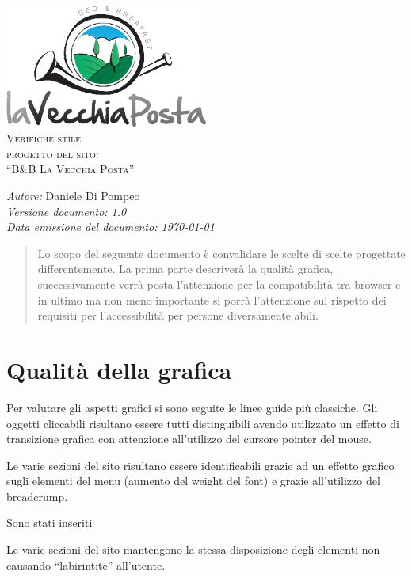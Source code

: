 \documentclass[a4paper,12pt,hidelinks]{report}
\begin{document}
  \begin{titlepage}
    \begin{center}
      \includegraphics[width=0.5\textwidth,keepaspectratio=true]{../img/logo}\\[1cm]    
      \textsc{\LARGE Verifiche stile}\\[0.6cm]
      \textsc{\LARGE  progetto del sito:\\[0.5cm] ``B\&B La Vecchia Posta''}\\ [2.0cm]

      \begin{minipage}{0.8\textwidth}
	\begin{flushleft} \large
	  \emph{Autore:} Daniele Di Pompeo \\[0.5cm]
	  \emph{Versione documento: 1.0}\\[0.5cm]
	  \emph{Data emissione del documento: \today}\\[0.5cm]
	\end{flushleft}
      \end{minipage}
    \end{center}
  \end{titlepage}

 
\begin{abstract}
Lo scopo del seguente documento è convalidare le scelte di scelte progettate differentemente. 
La prima parte descriverà la qualità grafica, successivamente verrà posta
l'attenzione per la compatibilità tra browser e in ultimo ma non meno importante si porrà l'attenzione sul rispetto dei requisiti per l'accessibilità per persone diversamente
abili.
\end{abstract}

\section*{Qualità della grafica}
Per valutare gli aspetti grafici si sono seguite le linee guide più classiche.
Gli oggetti cliccabili risultano essere tutti distinguibili avendo utilizzato un effetto di transizione grafica con attenzione all'utilizzo del cursore pointer del mouse.
\par Le varie sezioni del sito risultano essere identificabili grazie ad un effetto grafico sugli elementi del menu (aumento del weight del font) e grazie all'utilizzo 
del breadcrump.
\par Sono stati inseriti 
\par Le varie sezioni del sito mantengono la stessa disposizione degli elementi non causando ``labirintite'' all'utente.
\end{document}
